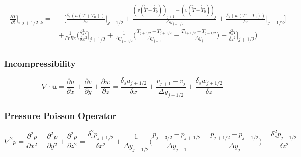 \documentclass[preprint,12pt]{article}
\begin{document}
\begin{align}	\begin{split}
\frac{\partial T}{\partial t}\Big|_{i,j+1/2,k}=&-\Bigg[\frac{ \delta_s(u(T+T_0))}{\delta x}\Big|_{j+1/2}+\frac{(v(\check{\check{T}}+\check{\check{T_0}}))_{j+1}-(v(\check{\check{T}}+\check{\check{T}}_0))_{j}}{\Delta y_{j+1/2}}+\frac{ \delta_s(w(T+T_0))}{\delta z}\Big|_{j+1/2} \Bigg]\\&+\frac{1}{PrRe}\Bigg(\frac{\delta_s^2T}{\delta x^2}\Bigg|_{j+1/2}+\frac{1}{\Delta y_{j+1/2}}\Big(\frac{T_{j+3/2}-T_{j+1/2}}{\Delta y_{j+1}}-\frac{T_{j+1/2}-T_{j-1/2}}{\Delta y_{j}}\Big) +\frac{\delta_s^2T}{\delta z^2}\Bigg|_{j+1/2}\Bigg)
\end{split}	\end{align} 
\subsubsection{Incompressibility}
\begin{equation}
\nabla\cdot \mathbf{u}=\frac{\partial u}{\partial x}+\frac{\partial v}{\partial y}+\frac{\partial w}{\partial z}=\frac{\delta_s u_{j+1/2}}{\delta x}+\frac{v_{j+1}-v_j}{\Delta y_{j+1/2}}+\frac{\delta_s w_{j+1/2}}{\delta z}
\end{equation}
\subsubsection{Pressure Poisson Operator}
\begin{equation}
\nabla^2 p=\frac{\partial^2 p}{\partial x^2}+\frac{\partial^2 p}{\partial y^2}+\frac{\partial^2p}{\partial z^2}=\frac{\delta_s^2 p_{j+1/2}}{\delta x^2}+\frac{1}{\Delta y_{j+1/2}}\Big(\frac{p_{j+3/2}-p_{j+1/2}}{\Delta y_{j+1}}-\frac{p_{j+1/2}-p_{j-1/2}}{\Delta y_{j}}\Big)+\frac{\delta_s^2 p_{j+1/2}}{\delta z^2}
\end{equation}
\end{document}
